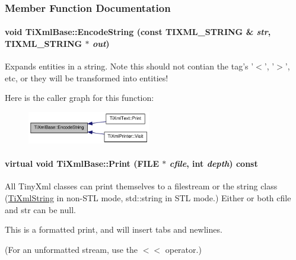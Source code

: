 \subsubsection{Member Function Documentation}
\hypertarget{class_ti_xml_base_a32ed202562b58de64c7d799ca3c9db98}{
\paragraph[{EncodeString}]{\setlength{\rightskip}{0pt plus 5cm}void TiXmlBase::EncodeString (const TIXML\_\-STRING \& {\em str}, \/  TIXML\_\-STRING $\ast$ {\em out})}\hfill}
\label{class_ti_xml_base_a32ed202562b58de64c7d799ca3c9db98}
Expands entities in a string. Note this should not contian the tag's '$<$', '$>$', etc, or they will be transformed into entities! 

Here is the caller graph for this function:\nopagebreak
\begin{figure}[H]
\begin{center}
\leavevmode
\includegraphics[width=152pt]{class_ti_xml_base_a32ed202562b58de64c7d799ca3c9db98_icgraph}
\end{center}
\end{figure}
\hypertarget{class_ti_xml_base_a0de56b3f2ef14c65091a3b916437b512}{
\paragraph[{Print}]{\setlength{\rightskip}{0pt plus 5cm}virtual void TiXmlBase::Print (FILE $\ast$ {\em cfile}, \/  int {\em depth}) const}\hfill}
\label{class_ti_xml_base_a0de56b3f2ef14c65091a3b916437b512}
All TinyXml classes can print themselves to a filestream or the string class (\hyperlink{class_ti_xml_string}{TiXmlString} in non-\/STL mode, std::string in STL mode.) Either or both cfile and str can be null.

This is a formatted print, and will insert tabs and newlines.

(For an unformatted stream, use the $<$$<$ operator.) 

